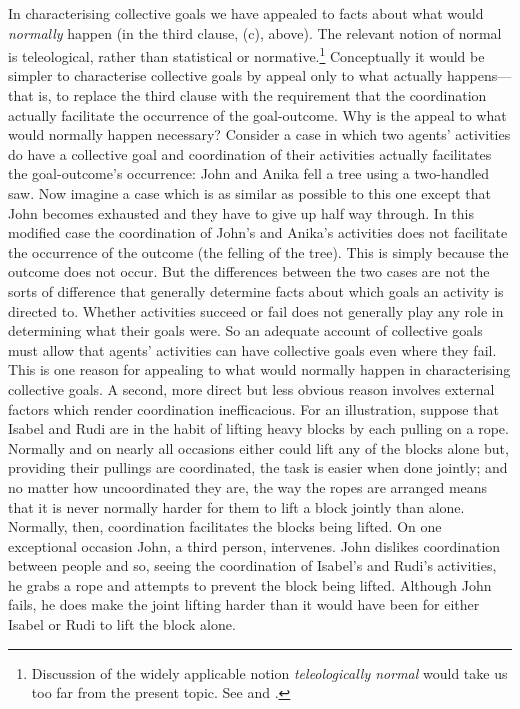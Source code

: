 \documentclass[12pt,a4paper]{extarticle}
\begin{document}
In characterising collective goals we have appealed to facts about what would \emph{normally} happen (in the third clause, (c), above).  
The relevant notion of normal is teleological, rather than statistical or normative.\footnote{
Discussion of the widely applicable notion \emph{teleologically normal} would take us too far from the present topic.  
See 
	\citet[p.\ 33ff.]{Millikan:1984ib} and 
	\citet[p.\ 48ff.]{Price:2001hs}.
}
Conceptually it would be simpler to characterise collective goals by appeal only to what actually happens---that is, to replace the third clause with the requirement that the coordination actually facilitate the occurrence of the goal-outcome.  
Why is the appeal to what would normally happen necessary? 
Consider a case in which two agents' activities do have a collective goal and coordination of their activities actually facilitates the goal-outcome's occurrence: John and Anika fell a tree using a two-handled saw.  
Now imagine a case which is as similar as possible to this one except that John becomes exhausted and they have to give up half way through.  
In this modified case the coordination of John's and Anika's activities does not facilitate the occurrence of the outcome (the felling of the tree).
This is simply because the outcome does not occur.  
But the differences between the two cases are not the sorts of difference that generally determine facts about which goals an activity is directed to.  
Whether activities succeed or fail does not generally play any role in determining what their goals were.
So an adequate account of collective goals must allow that agents' activities can have collective goals even where they fail.  
This is one reason for appealing to what would normally happen in characterising collective goals.  
A second, more direct but less obvious reason involves external factors which render coordination inefficacious.  For an illustration, suppose that Isabel and Rudi are in the habit of lifting heavy blocks by each pulling on a rope.  
Normally and on nearly all occasions either could lift any of the blocks alone but, providing their pullings are coordinated, the task is easier when done jointly;
and no matter how uncoordinated they are, the way the ropes are arranged means that it is never normally harder for them to lift a block jointly than alone.  
Normally, then, coordination facilitates the blocks being lifted.  
On one exceptional occasion John, a third person, intervenes.  John dislikes coordination between people and so, seeing the coordination of Isabel's and Rudi's activities, he grabs a rope and attempts to prevent the block being lifted.  Although John fails, he does make the joint lifting harder than it would have been for either Isabel or Rudi to lift the block alone.  
\end{document}
